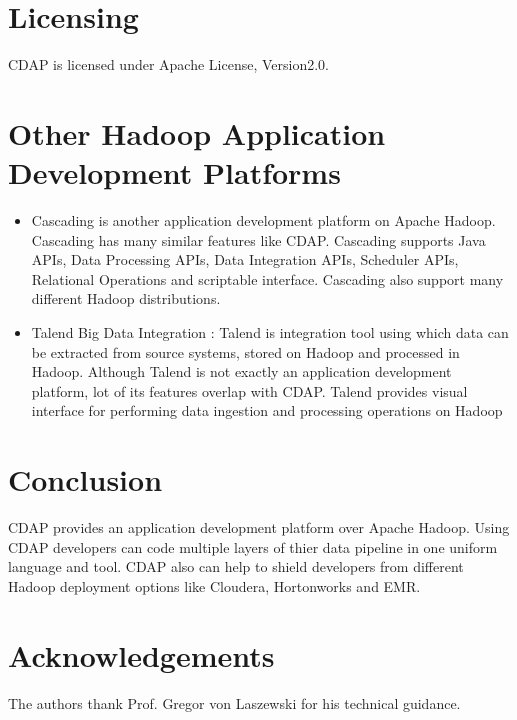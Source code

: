 \documentclass[9pt,twocolumn,twoside]{styles/osajnl}
\begin{document}
\section{Licensing}
CDAP is licensed \cite{www-cdap-license}under Apache License, Version2.0.

\section{Other Hadoop Application Development Platforms}
\begin{itemize}
\item Cascading \cite{www-cascading} is another application development
platform on Apache Hadoop. Cascading has many similar features like CDAP.
Cascading supports Java APIs, Data Processing APIs, Data Integration APIs,
Scheduler APIs, Relational Operations and scriptable interface. Cascading
also support many different Hadoop distributions.

\item Talend Big Data Integration \cite{www-talend} : Talend is integration
tool using which data can be extracted from source systems, stored on Hadoop
and processed in Hadoop. Although Talend is not exactly an application
development platform, lot of its features overlap with CDAP. Talend provides
visual interface for performing data ingestion and processing operations on
Hadoop
\end{itemize}

\section{Conclusion}
CDAP provides an application development platform over Apache Hadoop. Using
CDAP developers can code multiple layers of thier data pipeline in one
uniform language and tool. CDAP also can help to shield developers from
different Hadoop deployment options like Cloudera, Hortonworks and EMR.

\section*{Acknowledgements}

The authors thank Prof. Gregor von Laszewski for his technical guidance.




\end{document}
